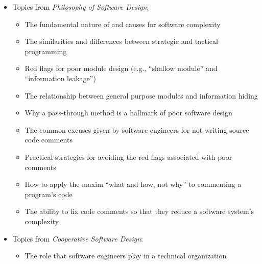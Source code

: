 \documentclass[11pt]{article}
\newcommand{\cooperative}{{\em Cooperative Software Design\/}}
\newcommand{\philosophy}{{\em Philosophy of Software Design\/}}
\begin{document}
\vspace*{-.05in}
\begin{itemize}

  \itemsep 0in
  \itemsep 0.05in

  \item Topics from \philosophy{}:
    \vspace*{-.05in}
    \begin{itemize}

      \itemsep 0.05in

      \item The fundamental nature of and causes for software complexity

      \item The similarities and differences between strategic and tactical
        programming

      \item Red flags for poor module design (e.g., ``shallow module'' and
        ``information leakage'')

      \item The relationship between general purpose modules and information
        hiding

      \item Why a pass-through method is a hallmark of poor software design

      \item The common excuses given by software engineers for not writing
        source code comments

      \item Practical strategies for avoiding the red flags associated with poor
        comments

      \item How to apply the maxim ``what and how, not why'' to commenting a
        program's code

      \item The ability to fix code comments so that they reduce a software
        system's complexity

    \end{itemize}

  \item Topics from \cooperative{}:
    \vspace*{-.05in}
    \begin{itemize}

      \itemsep 0.025in

      \item The role that software engineers play in a technical organization


\end{itemize}
\end{itemize}
\end{document}

